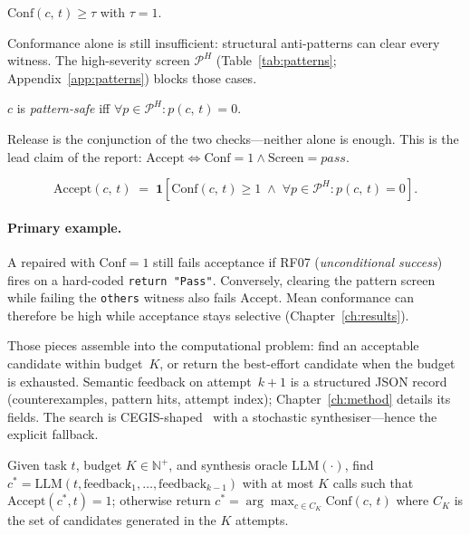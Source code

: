 \begin{definition}
\label{def:strict-success}
$\mathrm{Conf}(c,\,t) \ge \tau$ with $\tau = 1$.
\end{definition}

Conformance alone is still insufficient: structural anti-patterns can clear
every witness.
The high-severity screen $\mathcal{P}^H$ (Table~\ref{tab:patterns};
Appendix~\ref{app:patterns}) blocks those cases.

\begin{definition}
\label{def:pattern-violation}
$c$ is \emph{pattern-safe} iff
$\forall p \in \mathcal{P}^H : p(c,\,t) = 0$.
\end{definition}

Release is the conjunction of the two checks---neither alone is enough.
This is the lead claim of the report:
$\mathrm{Accept}\Leftrightarrow\mathrm{Conf}{=}1\wedge\mathrm{Screen}{=}\mathit{pass}$.

\begin{definition}
\label{def:accept}
\[
  \mathrm{Accept}(c,\,t)
  \;=\;
  \mathbf{1}\!\left[
    \mathrm{Conf}(c,\,t) \geq 1
    \;\land\;
    \forall p \in \mathcal{P}^H : p(c,\,t) = 0
  \right].
\]
\end{definition}

\paragraph{Primary example.}
A repaired  with $\mathrm{Conf}=1$ still fails
acceptance if RF07 (\emph{unconditional success}) fires on a hard-coded
\texttt{return "Pass"}.
Conversely, clearing the pattern screen while failing the \texttt{others}
witness also fails $\mathrm{Accept}$.
Mean conformance can therefore be high while acceptance stays selective
(Chapter~\ref{ch:results}).

Those pieces assemble into the computational problem: find an acceptable
candidate within budget~$K$, or return the best-effort candidate when the
budget is exhausted.
Semantic feedback on attempt~$k{+}1$ is a structured JSON record
(counterexamples, pattern hits, attempt index); Chapter~\ref{ch:method}
details its fields.
The search is CEGIS-shaped~\citep{solarlezama2008sketching,sun2024clover}
with a stochastic synthesiser---hence the explicit fallback.

\begin{definition}
\label{def:bap}
Given task $t$, budget $K \in \mathbb{N}^+$, and synthesis oracle
$\mathrm{LLM}(\cdot)$, find
$c^* = \mathrm{LLM}(t,\mathrm{feedback}_1,\ldots,\mathrm{feedback}_{k-1})$
with at most $K$ calls such that $\mathrm{Accept}(c^*, t) = 1$;
otherwise return
$c^* = \arg\max_{c \in C_K} \mathrm{Conf}(c,\,t)$
where $C_K$ is the set of candidates generated in the $K$ attempts.
\end{definition}

